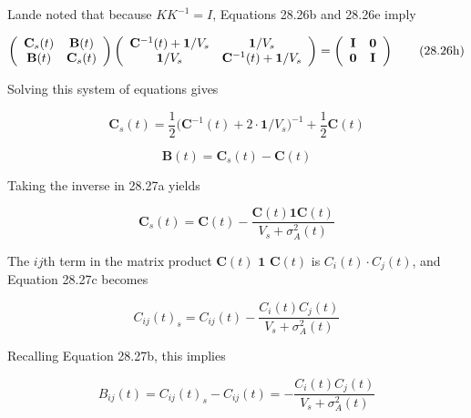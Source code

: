 \documentclass{article}
\begin{document}
Lande noted that because  $ KK^{-1} = I $, Equations 28.26b and 28.26e imply

\begin{equation}
\left(\begin{array}{c c}{\mathbf{C}_{s}(t)}&{\mathbf{B}(t)}\\ {\mathbf{B}(t)}&{\mathbf{C}_{s}(t)}\end{array}\right)\left(\begin{array}{c c}{\mathbf{C}^{-1}(t)+\mathbf{1}/V_{s}}&{\mathbf{1}/V_{s}}\\ {\mathbf{1}/V_{s}}&{\mathbf{C}^{-1}(t)+\mathbf{1}/V_{s}}\end{array}\right)=\left(\begin{array}{c c}{\mathbf{I}}&{\mathbf{0}}\\ {\mathbf{0}}&{\mathbf{I}}\end{array}\right)
\tag{28.26h}
\label{eq:28_26h}
\end{equation}

Solving this system of equations gives

\begin{equation}
\mathbf{C}_{s}(t)=\frac{1}{2}\Big(\mathbf{C}^{-1}(t)+2\cdot\mathbf{1}/V_{s}\Big)^{-1}+\frac{1}{2}\mathbf{C}(t)
\tag{28.27a}
\label{eq:28_27a}
\end{equation}

\begin{equation}
\mathbf{B}(t)=\mathbf{C}_{s}(t)-\mathbf{C}(t)
\tag{28.27b}
\label{eq:28_27b}
\end{equation}

Taking the inverse in 28.27a yields

\begin{equation}
\mathbf{C}_{s}(t)=\mathbf{C}(t)-\frac{\mathbf{C}(t)\mathbf{1}\mathbf{C}(t)}{V_{s}+\sigma_{A}^{2}(t)}
\tag{28.27c}
\label{eq:28_27c}
\end{equation}

The  $ ij $th term in the matrix product  $ \mathbf{C}(t) $  $ \mathbf{1} $  $ \mathbf{C}(t) $ is  $ C_i(t) \cdot C_j(t) $, and Equation 28.27c becomes

\begin{equation}
C_{ij}(t)_{s}=C_{ij}(t)-\frac{C_{i}(t)C_{j}(t)}{V_{s}+\sigma_{A}^{2}(t)}
\tag{28.27d}
\label{eq:28_27d}
\end{equation}

Recalling Equation 28.27b, this implies

\begin{equation}
B_{ij}(t)=C_{ij}(t)_{s}-C_{ij}(t)=-\frac{C_{i}(t)C_{j}(t)}{V_{s}+\sigma_{A}^{2}(t)}
\tag{28.27e}
\label{eq:28_27e}
\end{equation}
\end{document}
